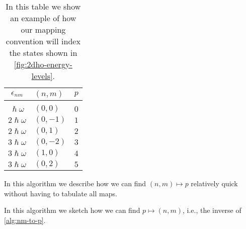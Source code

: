             \begin{table}
                \centering
                \caption{In this table we show an example of how our mapping
                convention will index the states shown in
                \autoref{fig:2dho-energy-levels}.}
                \begin{tabular}{c|ll}
                    $\epsilon_{nm}$ & $(n, m)$ & $p$ \\
                    \hline
                    \\
                    $\hslash\omega$ & $(0, 0)$ & $0$ \\
                    $2\hslash\omega$ & $(0, -1)$ & $1$ \\
                    $2\hslash\omega$ & $(0, 1)$ & $2$ \\
                    $3\hslash\omega$ & $(0, -2)$ & $3$ \\
                    $3\hslash\omega$ & $(1, 0)$ & $4$ \\
                    $3\hslash\omega$ & $(0, 2)$ & $5$
                \end{tabular}
                \label{tab:2dho-mapping}
            \end{table}

            \begin{algorithm}
                \caption{In this algorithm we describe how we can find $(n, m)
                \mapsto p$ relatively quick without having to tabulate all
                maps.}
                \label{alg:nm-to-p}
            \end{algorithm}

            \begin{algorithm}
                \caption{In this algorithm we sketch how we can find $p \mapsto
                (n, m)$, i.e., the inverse of \autoref{alg:nm-to-p}.}
                \label{alg:p-to-nm}
            \end{algorithm}

